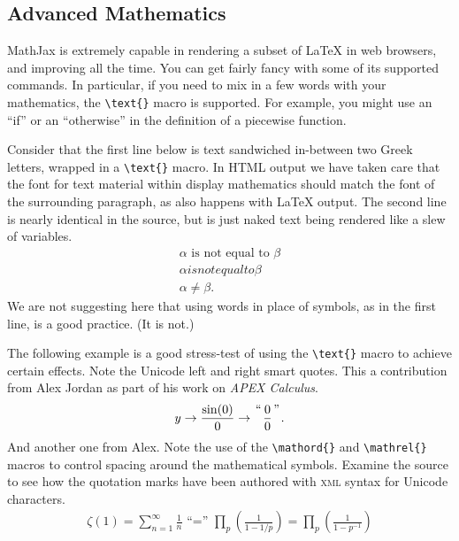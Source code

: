 \documentclass[10pt,]{article}
\newcommand{\initialism}[1]{\textsc{\MakeLowercase{#1}}}
\theoremstyle{plain}
\theoremstyle{definition}
\theoremstyle{definition}
\theoremstyle{definition}
\theoremstyle{definition}
\theoremstyle{definition}
\theoremstyle{definition}
\numberwithin{equation}{section}
\begin{document}
\subsection[{Advanced Mathematics}]{Advanced Mathematics}\label{subsection-11}
\hypertarget{p-193}{}%
MathJax is extremely capable in rendering a subset of \LaTeX{} in web browsers, and improving all the time.  You can get fairly fancy with some of its supported commands.  In particular, if you need to mix in a few words with your mathematics, the \lstinline?\text{}? macro is supported.  For example, you might use an ``if'' or an ``otherwise'' in the definition of a piecewise function.%
\par
\hypertarget{p-194}{}%
Consider that the first line below is text sandwiched in-between two Greek letters, wrapped in a \lstinline?\text{}? macro.  In HTML output we have taken care that the font for text material within display mathematics should match the font of the  surrounding paragraph, as also happens with \LaTeX{} output.  The second line is nearly identical in the source, but is just naked text being rendered like a slew of variables.%
\begin{gather*}
\alpha\text{ is not equal to }\beta\\
\alpha is not equal to \beta\\
\alpha\neq\beta\text{.}
\end{gather*}
We are not suggesting here that using words in place of symbols, as in the first line, is a good practice.  (It is not.)%
\par
\hypertarget{p-195}{}%
The following example is a good stress-test of using the \lstinline?\text{}? macro to achieve certain effects.  Note the Unicode left and right smart quotes.  This a contribution from Alex Jordan as part of his work on \textsl{APEX Calculus}.%
\begin{gather*}
y \rightarrow \frac{\sin(0) }{0} \rightarrow {{\text{“}}\atop{}}\frac{0}{0}{{\text{”}}\atop{}}\text{.}
\end{gather*}
And another one from Alex.  Note the use of the \lstinline?\mathord{}? and \lstinline?\mathrel{}? macros to control spacing around the mathematical symbols.  Examine the source to see how the quotation marks have been authored with \initialism{XML} syntax for Unicode characters.%
\begin{gather*}
\zeta(1)=\sum_{n=1}^{\infty}\frac{1}{n}\mathrel{\text{ “}\mathord{=}{\text{” }}}\prod_{p}\left(\frac{1}{1-1/p}\right)=\prod_{p}\left(\frac{1}{1-p^{-1}}\right)
\end{gather*}
\end{document}
